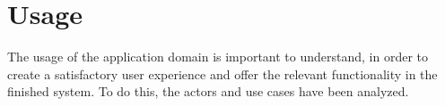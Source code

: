 \section{Usage}\label{sc:usage}
The usage of the application domain is important to understand, in order to create a satisfactory user experience and offer the relevant functionality in the finished system. To do this, the actors and use cases have been analyzed.